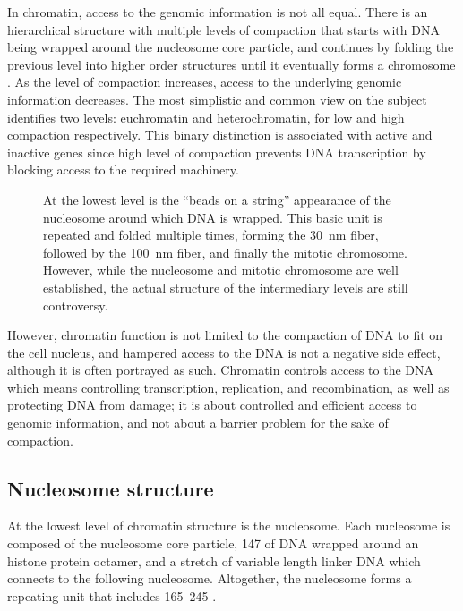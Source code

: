   In chromatin, access to the genomic information is not all equal.
  There is an hierarchical structure with
  multiple levels of compaction that starts with DNA being wrapped
  around the nucleosome core particle, and continues
  by folding the previous level into higher order structures
  until it eventually forms a chromosome .
  As the level of compaction increases, access to the underlying genomic
  information decreases.
  The most simplistic and common view on the subject
  identifies two levels: euchromatin and heterochromatin, for low and
  high compaction respectively.
  This binary distinction is associated with active and inactive genes
  since high level of compaction prevents DNA transcription by blocking
  access to the required machinery.

  \begin{figure}
    \centering
                 {At the lowest level is the ``beads on a string''
                  appearance of the nucleosome around which DNA is
                  wrapped.  This basic unit is repeated and folded
                  multiple times, forming the \SI{30}{\nano\meter}
                  fiber, followed by the \SI{100}{\nano\meter} fiber,
                  and finally the mitotic chromosome.  However, while
                  the nucleosome and mitotic chromosome are well
                  established, the actual structure of the intermediary
                  levels are still controversy.}
    \label{fig:intro:chromatin-structure}
  \end{figure}

  However, chromatin function is not limited to the compaction of DNA
  to fit on the
  cell nucleus, and hampered access to the DNA is not a negative side
  effect, although it is often portrayed as such.
  Chromatin controls access
  to the DNA which means controlling transcription, replication,
  and recombination, as
  well as protecting DNA from damage;  it is about controlled and efficient
  access to genomic information, and not about a barrier problem for the sake
  of compaction.

  \subsection{Nucleosome structure}

    At the lowest level of chromatin structure is the nucleosome.
    Each nucleosome is composed of the nucleosome core particle,
    \SI{147}{\bp} of DNA wrapped around
    an histone protein octamer,
    and a stretch of variable length linker DNA which connects
    to the following nucleosome.  Altogether, the nucleosome forms
    a repeating unit that includes \SIrange{165}{245}{\bp}
    \citep{widom1992-linker-length}.

